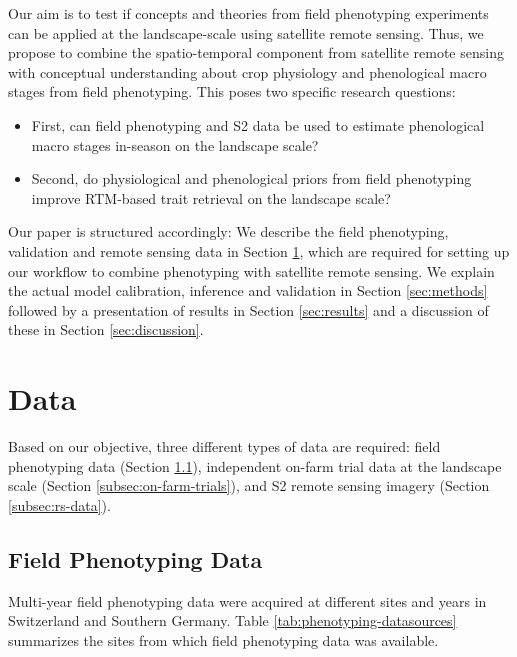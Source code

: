 Our aim is to test if concepts and theories from field phenotyping experiments can be applied at the landscape-scale using satellite remote sensing. Thus, we propose to combine the spatio-temporal component from satellite remote sensing with conceptual understanding about crop physiology and phenological macro stages from field phenotyping. This poses two specific research questions: 
\begin{itemize}
\item First, can field phenotyping and S2 data be used to estimate phenological macro stages in-season on the landscape scale?
\item Second, do physiological and phenological priors from field phenotyping improve RTM-based trait retrieval on the landscape scale? 
\end{itemize}
Our paper is structured accordingly: We describe the field phenotyping, validation and remote sensing data in Section \ref{sec:data}, which are required for setting up our workflow to combine phenotyping with satellite remote sensing. We explain the actual model calibration, inference and validation in Section \ref{sec:methods} followed by a presentation of results in Section \ref{sec:results} and a discussion of these in Section \ref{sec:discussion}.


\section{Data}
\label{sec:data}
Based on our objective, three different types of data are required: field phenotyping data (Section \ref{subsec:phenotyping-data}), independent on-farm trial data at the landscape scale (Section \ref{subsec:on-farm-trials}), and S2 remote sensing imagery (Section \ref{subsec:rs-data}).

\subsection{Field Phenotyping Data}
\label{subsec:phenotyping-data}
Multi-year field phenotyping data were acquired at different sites and years in Switzerland and Southern Germany. Table \ref{tab:phenotyping-datasources} summarizes the sites from which field phenotyping data was available.

